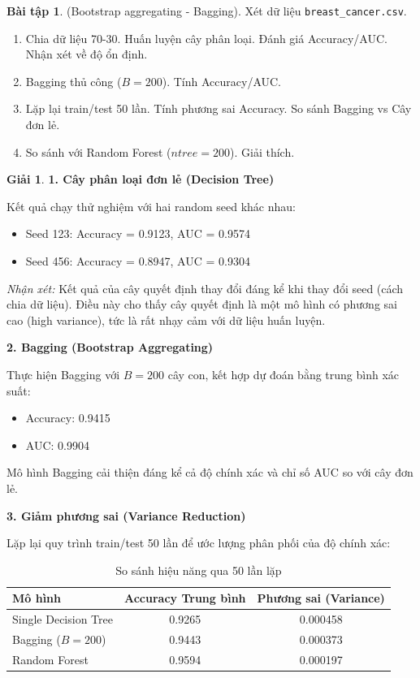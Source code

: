 \documentclass[12pt,xcolor=dvipsnames]{article}
\date{}
\theoremstyle{definition}
\newtheorem*{giai}{Giải}
\newtheorem{bt}{Bài tập}
\begin{document}
\begin{bt}
(Bootstrap aggregating - Bagging). Xét dữ liệu \texttt{breast\_cancer.csv}.
\begin{enumerate}
    \item[(a)] Chia dữ liệu 70-30. Huấn luyện cây phân loại. Đánh giá Accuracy/AUC. Nhận xét về độ ổn định.
    \item[(b)] Bagging thủ công ($B=200$). Tính Accuracy/AUC.
    \item[(c)] Lặp lại train/test 50 lần. Tính phương sai Accuracy. So sánh Bagging vs Cây đơn lẻ.
    \item[(d)] So sánh với Random Forest ($ntree=200$). Giải thích.
\end{enumerate}
\end{bt}

\begin{giai}
\textbf{1. Cây phân loại đơn lẻ (Decision Tree)}

Kết quả chạy thử nghiệm với hai random seed khác nhau:
\begin{itemize}
    \item Seed 123: Accuracy = 0.9123, AUC = 0.9574
    \item Seed 456: Accuracy = 0.8947, AUC = 0.9304
\end{itemize}
\textit{Nhận xét:} Kết quả của cây quyết định thay đổi đáng kể khi thay đổi seed (cách chia dữ liệu). Điều này cho thấy cây quyết định là một mô hình có phương sai cao (high variance), tức là rất nhạy cảm với dữ liệu huấn luyện.

\textbf{2. Bagging (Bootstrap Aggregating)}

Thực hiện Bagging với $B=200$ cây con, kết hợp dự đoán bằng trung bình xác suất:
\begin{itemize}
    \item Accuracy: 0.9415
    \item AUC: 0.9904
\end{itemize}
Mô hình Bagging cải thiện đáng kể cả độ chính xác và chỉ số AUC so với cây đơn lẻ.

\textbf{3. Giảm phương sai (Variance Reduction)}

Lặp lại quy trình train/test 50 lần để ước lượng phân phối của độ chính xác:

\begin{table}[h]
\centering
\begin{tabular}{lcc}
\toprule
\textbf{Mô hình} & \textbf{Accuracy Trung bình} & \textbf{Phương sai (Variance)} \\
\midrule
Single Decision Tree & 0.9265 & 0.000458 \\
Bagging ($B=200$) & 0.9443 & 0.000373 \\
Random Forest & 0.9594 & 0.000197 \\
\bottomrule
\end{tabular}
\caption{So sánh hiệu năng qua 50 lần lặp}
\end{table}


\end{giai}
\end{document}

